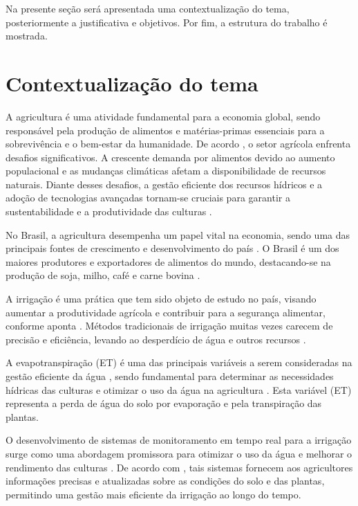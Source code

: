 Na presente seção será apresentada uma contextualização do tema, posteriormente a justificativa e objetivos. Por fim, a estrutura do trabalho é mostrada.

\section{Contextualização do tema}
A agricultura é uma atividade fundamental para a economia global, sendo responsável pela produção de alimentos e matérias-primas essenciais para a sobrevivência e o bem-estar da humanidade. De acordo \textcite{carmody_fao2023}, o setor agrícola enfrenta desafios significativos. A crescente demanda por alimentos devido ao aumento populacional e as mudanças climáticas afetam a disponibilidade de recursos naturais. Diante desses desafios, a gestão eficiente dos recursos hídricos e a adoção de tecnologias avançadas tornam-se cruciais para garantir a sustentabilidade e a produtividade das culturas \parencite{carmody_fao2023}.

No Brasil, a agricultura desempenha um papel vital na economia, sendo uma das principais fontes de crescimento e desenvolvimento do país \parencite{Ramos_irrigacao2022}. O Brasil é um dos maiores produtores e exportadores de alimentos do mundo, destacando-se na produção de soja, milho, café e carne bovina \parencite{Ramos_irrigacao2022}. 

A irrigação é uma prática que tem sido objeto de estudo no país, visando aumentar a produtividade agrícola e contribuir para a segurança alimentar, conforme aponta \textcite{Ramos_irrigacao2022}. Métodos tradicionais de irrigação muitas vezes carecem de precisão e eficiência, levando ao desperdício de água e outros recursos \parencite{Pereira_irrigation2002}.

A evapotranspiração (ET) é uma das principais variáveis a serem consideradas na gestão eficiente da água \parencite{yang_nature2023}, sendo fundamental para determinar as necessidades hídricas das culturas e otimizar o uso da água na agricultura \parencite{carmody_fao2023, yang_nature2023}. Esta variável (ET) representa a perda de água do solo por evaporação e pela transpiração das plantas. 

O desenvolvimento de sistemas de monitoramento em tempo real para a irrigação surge como uma abordagem promissora para otimizar o uso da água e melhorar o rendimento das culturas \parencite{Vijh_system2024, Dutta_system2024, Amine_system2024}. De acordo com \textcite{Prathibha_system2017}, tais sistemas fornecem aos agricultores informações precisas e atualizadas sobre as condições do solo e das plantas, permitindo uma gestão mais eficiente da irrigação ao longo do tempo.

